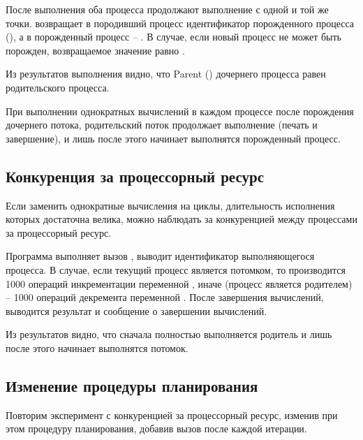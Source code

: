 После выполнения  оба процесса продолжают выполнение с одной и той же точки.  возвращает в породивший процесс идентификатор порожденного
процесса (), а в порожденный процесс -- . В случае, если новый процесс не может быть порожден, возвращаемое значение равно .



Из результатов выполнения видно, что Parent  () дочернего процесса равен  родительского процесса.

При выполнении однократных вычислений в каждом процессе после порождения дочернего потока, родительский поток продолжает выполнение (печать и завершение), и лишь после этого начинает выполнятся порожденный процесс.

\subsection{Конкуренция за процессорный ресурс}

Если заменить однократные вычисления на циклы, длительность исполнения которых достаточна велика, можно наблюдать за конкуренцией между процессами за процессорный ресурс. 



Программа выполняет вызов , выводит идентификатор выполняющегося процесса. В случае, если текущий процесс является потомком, то производится 1000 операций инкрементации переменной , иначе (процесс является родителем) -- 1000 операций декремента переменной . После завершения вычислений, выводится результат и сообщение о завершении вычислений.



Из результатов видно, что сначала полностью выполняется родитель и лишь после этого начинает выполнятся потомок.

\subsection{Изменение процедуры планирования}

Повторим эксперимент с конкуренцией за процессорный ресурс, изменив при этом процедуру планирования, добавив вызов  после каждой итерации.



